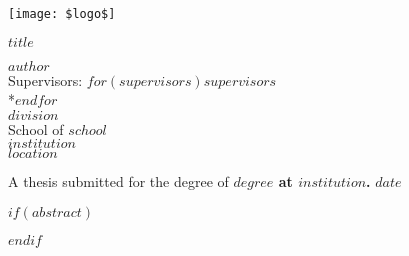 \documentclass[oneside,11pt,a4paper] {report}
\date{}
\begin{document}
\begin{titlepage}
  \pagestyle{empty}
  \begin{center}
    \texttt{[image: \$logo\$]}
  \end{center}
  \vskip 2cm

  \begin{minipage}{0.85\textwidth}
    \vskip 0.9cm
      \begin{center}
        {\rmfamily\LARGE\bf\expandafter{$title$}}
      \end{center}
  \end{minipage}

  \vskip 1.5cm

  {\sc\rmfamily\Large\bf $author$}\\

  {\rmfamily\large Supervisors: $for(supervisors)$$supervisors$\\*$endfor$}\\

  \vskip 2.0cm
  {\rmfamily\large $division$ \\ School of $school$ \\ $institution$ \\ $location$}

  \vfill
  \begin{minipage}{0.8\textwidth}
    \begin{center}
      {\rmfamily A thesis submitted for the degree of \bf{$degree$} at
      $institution$.}
      \vfill
      {$date$}
    \end{center}
  \end{minipage}
\end{titlepage}

\newpage





\cleardoublepage

$if(abstract)$
  \ifdigital
  \fi
  \begin{abstract}
    \pagestyle{empty}
    $abstract$
  \end{abstract}

  \newpage
  \thispagestyle{empty}
  \cleardoublepage
$endif$
\end{document}

